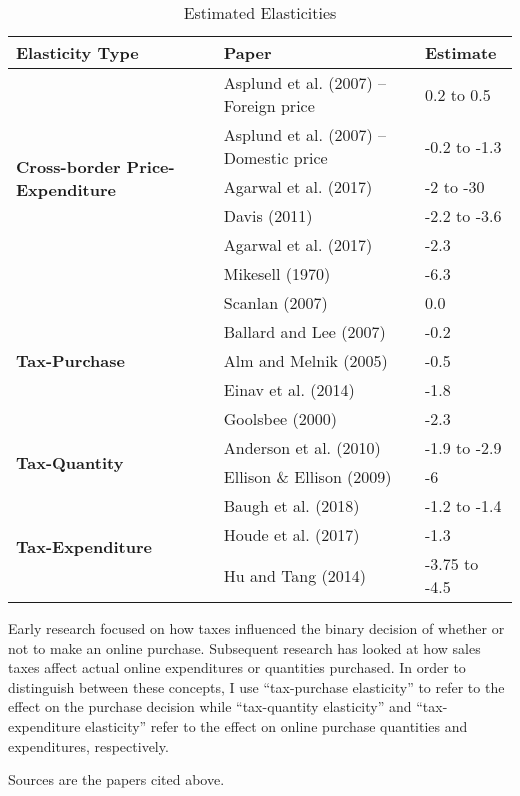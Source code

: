 \begin{table}
\centering
\caption{Estimated Elasticities}
\label{tab:elasticity}
\begin{tabular}{lll}
\hline
\textbf{Elasticity Type}           & \textbf{Paper}                     & \textbf{Estimate}     \\
\hline \hline
\multirow{6}{3.5cm}{\textbf{Cross-border Price-Expenditure}} &
  Asplund et al. (2007) -- Foreign price    & 0.2 to 0.5   \\
& Asplund et al. (2007) -- Domestic price & -0.2 to -1.3 \\
& Agarwal et al. (2017)                 & -2 to -30    \\
& Davis (2011)                                        & -2.2 to -3.6 \\
& Agarwal et al. (2017)            & -2.3         \\
& Mikesell (1970)                                     & -6.3         \\ \hline
\multirow{5}{3.5cm}{\textbf{Tax-Purchase}} &
  Scanlan (2007)                                        &  0.0          \\
& Ballard and Lee (2007)                               & -0.2          \\
& Alm and Melnik (2005)                                & -0.5          \\
& Einav et al. (2014)        & -1.8          \\
& Goolsbee (2000)                                     & -2.3          \\ \hline
\multirow{2}{3.5cm}{\textbf{Tax-Quantity}} &
  Anderson et al. (2010)          & -1.9 to -2.9  \\
& Ellison \& Ellison (2009)                           & -6            \\ \hline
\multirow{3}{3.5cm}{\textbf{Tax-Expenditure}} &
  Baugh et al. (2018)                      & -1.2 to -1.4  \\
& Houde et al. (2017)                     & -1.3          \\
& Hu and Tang (2014)                                  & -3.75 to -4.5 \\ \hline
\end{tabular}
\begin{tablenotes}
Early research focused on how taxes influenced the binary decision of whether or not to make an online purchase. Subsequent research has looked at how sales taxes affect actual online expenditures or quantities purchased. In order to distinguish between these concepts, I use ``tax-purchase elasticity'' to refer to the effect on the purchase decision while ``tax-quantity elasticity'' and ``tax-expenditure elasticity'' refer to the effect on online purchase quantities and expenditures, respectively.
\end{tablenotes}
\begin{tablenotes}[Source]
Sources are the papers cited above.
\end{tablenotes}
\end{table}
